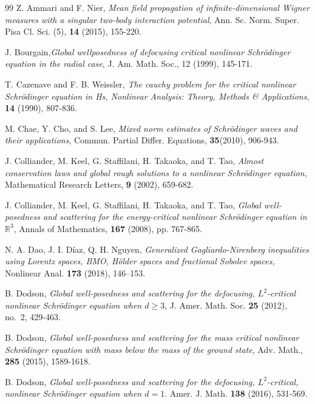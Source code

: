 \documentclass[reqno,11pt]{amsart}
\theoremstyle{plain}
\theoremstyle{definition}
\numberwithin{equation}{section}
\numberwithin{theorem}{section}
\def\geq{\geqslant}
\def\R{\mathbb{R}}
\begin{document}
\begin{thebibliography}{99}
Z. Ammari and F. Nier, \emph{Mean field propagation of infinite-dimensional Wigner measures with a singular two-body
interaction potential}, Ann. Sc. Norm. Super. Pisa Cl. Sci. (5), {\bf 14} (2015), 155-220.

J. Bourgain,\emph{Global wellposedness of defocusing critical nonlinear Schrödinger equation in the radial case}, J. Am. Math.
Soc., 12 (1999), 145-171.

T. Cazenave and F. B. Weissler, \emph{The cauchy problem for the critical nonlinear Schrödinger equation in Hs, Nonlinear Analysis: Theory, Methods \& Applications}, {\bf 14} (1990), 807-836.

 M. Chae, Y. Cho, and S. Lee, \emph{Mixed norm estimates of Schr\"odinger waves and their applications}, Commun. Partial Differ. Equations, {\bf 35}(2010), 906-943.

J. Colliander, M. Keel, G. Staffilani, H. Takaoka, and T. Tao, \emph{Almost conservation laws and global rough solutions to a nonlinear Schr\"odinger equation}, Mathematical Research Letters, {\bf 9} (2002),  659-682.

J. Colliander, M. Keel, G. Staffilani, H. Takaoka, and T. Tao, \emph{Global well-posedness and scattering for the energy-critical nonlinear Schr\"odinger equation in $\R^3$}, Annals of Mathematics, {\bf 167} (2008), pp. 767-865.

	N. A. Dao, J. I. D\'iaz, Q. H. Nguyen,
	\emph{Generalized Gagliardo-Nirenberg inequalities using Lorentz spaces, BMO, H\"older spaces and fractional Sobolev spaces,}
	Nonlinear Anal. \textbf{173} (2018), 146–153.

 B. Dodson, \emph{Global well-posedness and scattering for the defocusing, $L^{2}$-critical nonlinear Schr\"odinger equation when $d\geq3$}, J. Amer. Math. Soc. {\bf 25} (2012), no.~2, 429-463.

 B. Dodson, \emph{Global well-posedness and scattering for the mass critical nonlinear Schr\"odinger
equation with mass below the mass of the ground state}, Adv. Math., {\bf285} (2015), 1589-1618.

B. Dodson,
\emph{Global well-posedness and scattering for the defocusing, $L^2$-critical, nonlinear Schr\"odinger equation when $d=1$}.  Amer. J. Math. {\bf138} (2016), 531-569.


\end{thebibliography}
\end{document}
